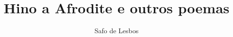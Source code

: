 \documentclass[12pt]{extarticle}
\begin{document}

\newcommand{\AutorLivro}{Safo de Lesbos}
\newcommand{\TituloLivro}{Hino a Afrodite e outros poemas}
\newcommand{\Tema}{Ficção, mistério e fantasia}
\newcommand{\Genero}{Poema}
\newcommand{\imagemCapa}{./images/PNLD0035-01.png}
\newcommand{\issnppub}{---}
\newcommand{\issnepub}{---}
\newcommand{\colaborador}{\textbf{Fulano de Tal} é uma pessoa incrível e vai fazer um bom serviço.}


\title{\TituloLivro}
\author{\AutorLivro}
\def\authornotes{\colaborador}

\date{}
\maketitle

\baselineskip\par
\end{document}
